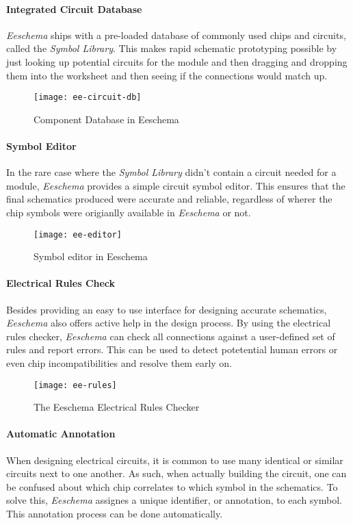 \paragraph{Integrated Circuit Database}
\emph{Eeschema} ships with a pre-loaded database of commonly used chips and circuits, called the \emph{Symbol Library}.
This makes rapid schematic prototyping possible by just looking up potential circuits for the module and then dragging and dropping
them into the worksheet and then seeing if the connections would match up.

\begin{figure}[h]
  \centering
  \texttt{[image: ee-circuit-db]}
  \caption{Component Database in Eeschema}
  \label{ee-circuit-db}
\end{figure}

\paragraph{Symbol Editor}
In the rare case where the \emph{Symbol Library} didn't contain a circuit needed for a module, \emph{Eeschema} provides
a simple circuit symbol editor. This ensures that the final schematics produced were accurate and reliable, regardless of wherer
the chip symbols were origianlly available in \emph{Eeschema} or not.

\begin{figure}[h]
  \centering
  \texttt{[image: ee-editor]}
  \caption{Symbol editor in Eeschema}
  \label{ee-editor}
\end{figure}

\paragraph{Electrical Rules Check}
Besides providing an easy to use interface for designing accurate schematics, \emph{Eeschema} also offers active help in the
design process. By using the electrical rules checker, \emph{Eeschema} can check all connections against a user-defined set of
rules and report errors. This can be used to detect potetential human errors or even chip incompatibilities and resolve them
early on.

\begin{figure}[h]
  \centering
  \texttt{[image: ee-rules]}
  \caption{The Eeschema Electrical Rules Checker}
  \label{ee-rules}
\end{figure}

\paragraph{Automatic Annotation}
When designing electrical circuits, it is common to use many identical or similar circuits next to one another. As such,
when actually building the circuit, one can be confused about which chip correlates to which symbol in the schematics.
To solve this, \emph{Eeschema} assignes a unique identifier, or annotation, to each symbol. This annotation process can be
done automatically.

